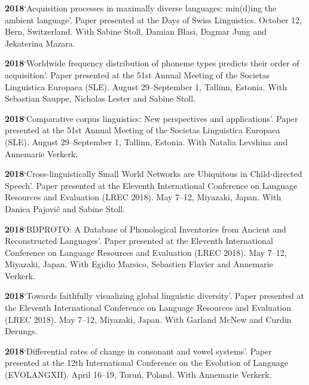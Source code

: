 \documentclass[11pt]{article}
\newcommand{\hangpara}{
 \setlength{\parindent}{0in} %
 \hangindent=0.42in %
}
\begin{document}
\hangpara
\vskip 6pt
{\bf 2018}\hspace{1ex}`Acquisition processes in maximally diverse languages: min(d)ing the ambient language'. Paper presented at the Days of Swiss Linguistics. October 12, Bern, Switzerland. With Sabine Stoll, Damian Blasi, Dagmar Jung and Jekaterina Mazara.

\vskip 6pt
\hangpara
{\bf 2018}\hspace{1ex}`Worldwide frequency distribution of phoneme types predicts their order of acquisition'. Paper presented at the 51st Annual Meeting of the Societas Linguistica Europaea (SLE). August 29--September 1, Tallinn, Estonia. With Sebastian Sauppe, Nicholas Lester and Sabine Stoll.

\vskip 6pt
\hangpara
{\bf 2018}\hspace{1ex}`Comparative corpus linguistics: New perspectives and applications'. Paper presented at the 51st Annual Meeting of the Societas Linguistica Europaea (SLE). August 29--September 1, Tallinn, Estonia. With Natalia Levshina and Annemarie Verkerk.

\vskip 6pt
\hangpara
{\bf 2018}\hspace{1ex}`Cross-linguistically Small World Networks are Ubiquitous in Child-directed Speech'. Paper presented at the Eleventh International Conference on Language Resources and Evaluation (LREC 2018). May 7--12, Miyazaki, Japan. With Danica Pajovi{\'c} and Sabine Stoll.

\vskip 6pt
\hangpara
{\bf 2018}\hspace{1ex}`BDPROTO: A Database of Phonological Inventories from Ancient and Reconstructed Languages'. Paper presented at the Eleventh International Conference on Language Resources and Evaluation (LREC 2018). May 7--12, Miyazaki, Japan. With Egidio Marsico, Sebastien Flavier and Annemarie Verkerk.

\vskip 6pt
\hangpara
{\bf 2018}\hspace{1ex}`Towards faithfully visualizing global linguistic diversity'. Paper presented at the Eleventh International Conference on Language Resources and Evaluation (LREC 2018). May 7--12, Miyazaki, Japan. With Garland McNew and Curdin Derungs.

\vskip 6pt
\hangpara
{\bf 2018}\hspace{1ex}`Differential rates of change in consonant and vowel systems'. Paper presented at the 12th International Conference on the Evolution of Language (EVOLANGXII). April 16--19, Toru{\'n}, Poland. With Annemarie Verkerk. %
\end{document}
